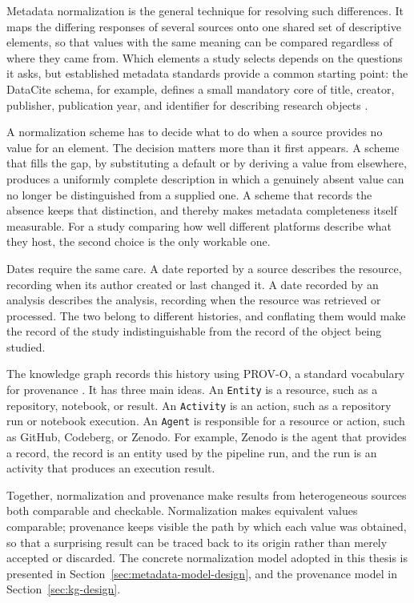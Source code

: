 Metadata normalization is the general technique for resolving such differences. It maps the differing responses of several sources onto one shared set of descriptive elements, so that values with the same meaning can be compared regardless of where they came from. Which elements a study selects depends on the questions it asks, but established metadata standards provide a common starting point: the DataCite schema, for example, defines a small mandatory core of title, creator, publisher, publication year, and identifier for describing research objects \cite{datacite45}.

A normalization scheme has to decide what to do when a source provides no value for an element. The decision matters more than it first appears. A scheme that fills the gap, by substituting a default or by deriving a value from elsewhere, produces a uniformly complete description in which a genuinely absent value can no longer be distinguished from a supplied one. A scheme that records the absence keeps that distinction, and thereby makes metadata completeness itself measurable. For a study comparing how well different platforms describe what they host, the second choice is the only workable one.

Dates require the same care. A date reported by a source describes the resource, recording when its author created or last changed it. A date recorded by an analysis describes the analysis, recording when the resource was retrieved or processed. The two belong to different histories, and conflating them would make the record of the study indistinguishable from the record of the object being studied.

The knowledge graph records this history using PROV-O, a standard vocabulary for provenance \cite{prov2013}. It has three main ideas. An \texttt{Entity} is a resource, such as a repository, notebook, or result. An \texttt{Activity} is an action, such as a repository run or notebook execution. An \texttt{Agent} is responsible for a resource or action, such as GitHub, Codeberg, or Zenodo. For example, Zenodo is the agent that provides a record, the record is an entity used by the pipeline run, and the run is an activity that produces an execution result.

Together, normalization and provenance make results from heterogeneous sources both comparable and checkable. Normalization makes equivalent values comparable; provenance keeps visible the path by which each value was obtained, so that a surprising result can be traced back to its origin rather than merely accepted or discarded. The concrete normalization model adopted in this thesis is presented in Section~\ref{sec:metadata-model-design}, and the provenance model in Section~\ref{sec:kg-design}.

